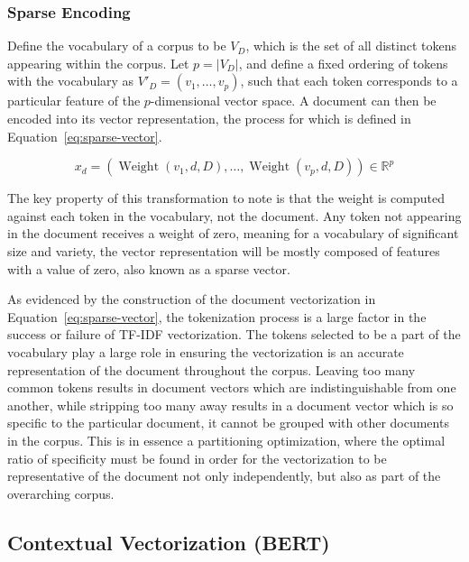 \documentclass[11pt]{article}
\theoremstyle{plain}
\theoremstyle{definition}
\begin{document}
\subsubsection{Sparse Encoding}\label{sec:background-lexical-encoding}

Define the vocabulary of a corpus to be $V_D$, which is the set of all distinct tokens appearing within the corpus. Let $p=|V_D|$, and define a fixed ordering of tokens with the vocabulary as $V'_D = (v_1, \dots, v_p)$, such that each token corresponds to a particular feature of the $p$-dimensional vector space. A document can then be encoded into its vector representation, the process for which is defined in Equation~\ref{eq:sparse-vector}.

\begin{equation}\label{eq:sparse-vector}
    x_d = (\operatorname{Weight}(v_1,d,D), \dots , \operatorname{Weight}(v_p,d,D)) \in \mathbb{R}^p
\end{equation}

The key property of this transformation to note is that the weight is computed against each token in the vocabulary, not the document. Any token not appearing in the document receives a weight of zero, meaning for a vocabulary of significant size and variety, the vector representation will be mostly composed of features with a value of zero, also known as a sparse vector.

As evidenced by the construction of the document vectorization in Equation~\ref{eq:sparse-vector}, the tokenization process is a large factor in the success or failure of TF-IDF vectorization. The tokens selected to be a part of the vocabulary play a large role in ensuring the vectorization is an accurate representation of the document throughout the corpus. Leaving too many common tokens results in document vectors which are indistinguishable from one another, while stripping too many away results in a document vector which is so specific to the particular document, it cannot be grouped with other documents in the corpus. This is in essence a partitioning optimization, where the optimal ratio of specificity must be found in order for the vectorization to be representative of the document not only independently, but also as part of the overarching corpus.

\subsection{Contextual Vectorization (BERT)}\label{sec:background-contextual}
\end{document}
